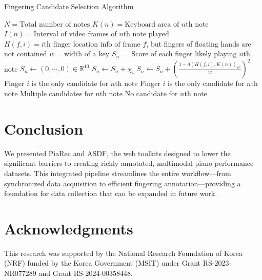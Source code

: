 \documentclass{article}
\begin{document}
\begin{algorithm}[h!]
\caption{Fingering Candidate Selection Algorithm}\label{alg:fingeringalgo}
\begin{algorithmic}
\State $N = \text{Total number of notes}$
\State $K(n) = \text{Keyboard area of $n$th note}$
\State $I(n) = \text{Interval of video frames of $n$th note played}$
\State $H(f,i) = i\text{th finger location info of frame $f$,} $ but fingers of floating hands are not contained
\State $w = \text{width of a key}$ 
\State $S_n =$ Score of each finger likely playing $n$th note
\State $S_n \gets (0,\cdots,0)\in \mathbb{R}^{10}$
\State $S_n\gets S_n + \chi_i$ 
\State $S_n \gets S_n + \left(\frac{1-d(H(f,i),K(n))_{\mathbb{R}^2}}{w}\right)^{2}$
\EndIf
\EndFor
\EndFor
{}
\State Finger $i$ is the only candidate for $n$th note
\State Finger $i$ is the only candidate for $n$th note
\Else \text{ }  Multiple candidates for $n$th note
\EndIf
\Else \text{ } No candidate for $n$th note
\EndIf
\EndFor
\end{algorithmic}
\end{algorithm}
\vspace{-5mm}
\section{Conclusion}
We presented PiaRec and ASDF, the web toolkits designed to lower the significant barriers to creating richly annotated, multimodal piano performance datasets. This integrated pipeline streamlines the entire workflow---from synchronized data acquisition to efficient fingering annotation---providing a foundation for data collection that can be expanded in future work.

\section{Acknowledgments}
This research was supported by the National Research Foundation of Korea (NRF) funded by the Korea Government (MSIT) under Grant RS-2023-NR077289 and Grant RS-2024-00358448.


\end{document}
